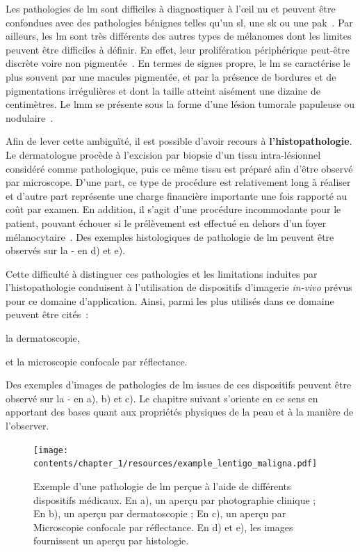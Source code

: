 Les pathologies de \gls{lm} sont difficiles à diagnostiquer à l’œil nu et peuvent être confondues avec des pathologies bénignes telles qu'un \gls{sl}, une \gls{sk} ou une \gls{pak}~\cite{LeDuff2014}. Par ailleurs, les \gls{lm} sont très différents des autres types de mélanomes dont les limites peuvent être difficiles à définir. En effet, leur prolifération périphérique peut-être discrète voire non pigmentée~\cite{LeGal2011}. En termes de signes propre, le \gls{lm} se caractérise le plus souvent par une macules pigmentée, et par la présence de bordures et de pigmentations irrégulières et dont la taille atteint aisément une dizaine de centimètres. Le \gls{lmm} se présente sous la forme d'une lésion tumorale papuleuse ou nodulaire~\cite{Mckenna2006, LeGal2011}.\par

Afin de lever cette ambiguïté, il est possible d'avoir recours à \textbf{l'histopathologie}. Le dermatologue procède à l'excision par biopsie d'un tissu intra-lésionnel considéré comme pathologique, puis ce même tissu est préparé afin d'être observé par microscope. D'une part, ce type de procédure est relativement long à réaliser et d'autre part représente une charge financière importante une fois rapporté au coût par examen. En addition, il s'agit d'une procédure incommodante pour le patient, pouvant échouer si le prélèvement est effectué en dehors d'un foyer mélanocytaire~\cite{LeGal2011}. Des exemples histologiques de pathologie de \gls{lm} peuvent être observés sur la  - en d) et e).\par

Cette difficulté à distinguer ces pathologies et les limitations induites par l'histopathologie conduisent à l'utilisation de dispositifs d'imagerie \textit{in-vivo} prévus pour ce domaine d'application. Ainsi, parmi les plus utilisés dans ce domaine peuvent être cités~:
\begin{inlinerate}
    \item la dermatoscopie,
    \item et la microscopie confocale par réflectance.
\end{inlinerate} Des exemples d'images de pathologies de \gls{lm} issues de ces dispositifs peuvent être observé sur la  - en a), b) et c). Le chapitre suivant s'oriente en ce sens en apportant des bases quant aux propriétés physiques de la peau et à la manière de l'observer.\par

\begin{figure}[H]
    \centering
    \texttt{[image: contents/chapter\_1/resources/example\_lentigo\_maligna.pdf]}
    \caption{Exemple d'une pathologie de \gls{lm} perçue à l'aide de différents dispositifs médicaux. En a), un aperçu par photographie clinique ; En b), un aperçu par dermatoscopie ; En c), un aperçu par Microscopie confocale par réflectance. En d) et e), les images fournissent un aperçu par histologie.}
    \label{fig:example_lentigo_maligna}
\end{figure}\par